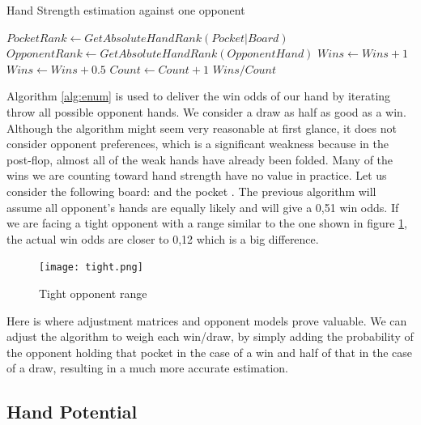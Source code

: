 \begin{Algorithmus}[H]
    \caption{Hand Strength estimation against one opponent}
    \label{alg:enum}
    \begin{algorithmic}
        \State $PocketRank \gets GetAbsoluteHandRank(Pocket | Board)$
        \State $OpponentRank \gets GetAbsoluteHandRank(OpponentHand)$
        \State $Wins \gets Wins + 1$
        \EndIf
        \State $Wins \gets Wins + 0.5$
        \EndIf
        \State $Count \gets Count + 1$
        \EndFor
        \State \Return $Wins / Count$
        \EndProcedure
    \end{algorithmic}
\end{Algorithmus}

Algorithm \ref{alg:enum} is used to deliver the win odds of our hand by iterating throw all possible opponent hands. We consider a draw as half as good as a win. Although the algorithm might seem very reasonable at first glance, it does not consider opponent preferences, which is a significant weakness because in the post-flop, almost all of the weak hands have already been folded. Many of the wins we are counting toward hand strength have no value in practice. Let us consider the following board:  and the pocket . The previous algorithm will assume all opponent's hands are equally likely and will give a 0,51 win odds. If we are facing a tight opponent with a range similar to the one shown in figure \ref{fig:tight}, the actual win odds are closer to 0,12 which is a big difference.

\begin{figure}[h]
    \centering
    \texttt{[image: tight.png]}
    \caption{Tight opponent range}
    \label{fig:tight}
\end{figure}

Here is where adjustment matrices and opponent models prove valuable. We can adjust the algorithm to weigh each win/draw, by simply adding the probability of the opponent holding that pocket in the case of a win and half of that in the case of a draw, resulting in a much more accurate estimation.

\subsection{Hand Potential}

